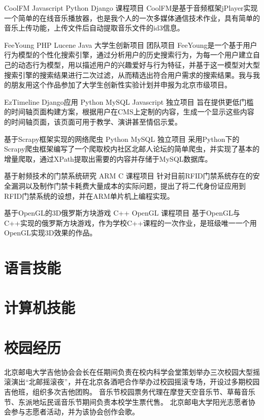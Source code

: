 \documentclass[11pt,a4paper]{moderncv}
\begin{document}
{CoolFM}
{Javascript Python Django}
{课程项目}{}
{CoolFM是基于音频框架jPlayer实现一个简单的在线音乐播放器，也是我个人的一次多媒体通信技术作业，具有简单的音乐上传功能，上传文件后自动提取音乐文件的id3信息。}

{FeeYoung}
{PHP Lucene Java}
{大学生创新项目 团队项目}{}
{FeeYoung是一个基于用户行为模型的个性化搜索引擎，通过分析用户的历史搜索行为，为每一个用户建立自己的动态行为模型，用以描述用户的兴趣爱好与行为特征，并基于这一模型对大型搜索引擎的搜索结果进行二次过滤，从而精选出符合用户需求的搜索结果。我与我的朋友用这个作品参加了大学生创新性实验计划并申报为北京市级项目。}

{EzTimeline}
{Django应用 Python MySQL Javascript}
{独立项目}{}
{旨在提供更低门槛的时间轴页面构建方案，根据用户在CMS上定制的内容，生成一个显示这些内容的时间轴页面，该页面可用于教学、演讲甚至情侣示爱。}

{基于Scrapy框架实现的网络爬虫}
{Python MySQL}
{独立项目}{}
{采用Python下的Scrapy爬虫框架编写了一个爬取校内社区北邮人论坛的简单爬虫，并实现了基本的增量爬取，通过XPath提取出需要的内容并存储于MySQL数据库。}

{基于射频技术的门禁系统研究}
{ARM C}
{课程项目}{}
{针对目前RFID门禁系统存在的安全漏洞以及制作门禁卡耗费大量成本的实际问题，提出了将二代身份证应用到RFID门禁系统的设想，并在ARM单片机上编程实现。}

{基于OpenGL的3D俄罗斯方块游戏}
{C++ OpenGL}
{课程项目}{}
{基于OpenGL与C++实现的俄罗斯方块游戏，作为学校C++课程的一次作业，是班级唯一一个用OpenGL实现3D效果的作品。}

\section{语言技能}

\section{计算机技能}


\section{校园经历} %
{北京邮电大学吉他协会会长}{}{}{}{在任期间负责在校内科学会堂策划举办三次校园大型摇滚演出“北邮摇滚夜”，并在北京各酒吧合作举办过校园摇滚专场，开设过多期校园吉他班，组织多次吉他团购。}
{音乐节校园票务代理}{}{}{}{在摩登天空音乐节、草莓音乐节、东派地坛民谣音乐节期间负责本校学生票代售。}
{北京邮电大学阳光志愿者协会}{}{}{}{参与志愿者活动，并为该协会创作会歌。}
\end{document}
